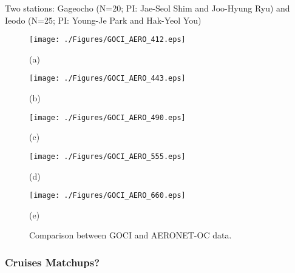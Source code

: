 \documentclass[onecolumn,3p,letterpaper,11pt]{elsarticle}
\begin{document}
Two stations: Gageocho (N=20; PI: Jae-Seol Shim and Joo-Hyung Ryu) and Ieodo (N=25; PI: Young-Je Park and Hak-Yeol You)

\begin{figure}[htb!]
    \begin{minipage}[c]{0.48\linewidth}
      \centering
      \texttt{[image: ./Figures/GOCI\_AERO\_412.eps]}
    \centerline{(a)}\medskip
    \end{minipage}  
    \hfill
    \begin{minipage}[c]{0.48\linewidth}
      \centering
      \texttt{[image: ./Figures/GOCI\_AERO\_443.eps]}
      \centerline{(b)}\medskip
    \end{minipage}  

  \begin{minipage}[c]{0.48\linewidth}
      \centering
      \texttt{[image: ./Figures/GOCI\_AERO\_490.eps]}
    \centerline{(c)}\medskip
    \end{minipage}  
    \hfill
    \begin{minipage}[c]{0.48\linewidth}
      \centering
      \texttt{[image: ./Figures/GOCI\_AERO\_555.eps]}
      \centerline{(d)}\medskip
    \end{minipage}  

  \begin{minipage}[c]{1.0\linewidth}
      \centering
      \texttt{[image: ./Figures/GOCI\_AERO\_660.eps]}
      \centerline{(e)}\medskip
    \end{minipage}   

    \caption{Comparison between GOCI and AERONET-OC data. \label{fig:GOCI_AERO} } 
\end{figure}
\subsubsection{Cruises Matchups?}

\end{document}
